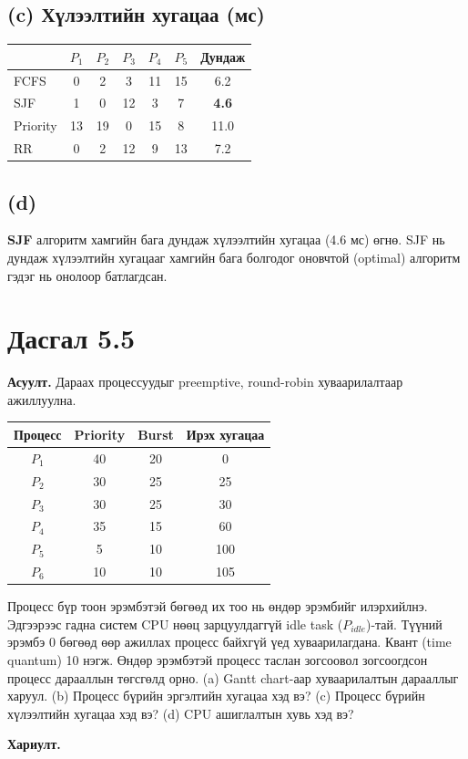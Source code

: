 \documentclass[12pt,a4paper]{article}
\newcommand{\question}[2]{\section{Дасгал #1}\textbf{Асуулт.} #2\par\medskip\textbf{Хариулт.}\par}
\begin{document}
\subsection{(c) Хүлээлтийн хугацаа (мс)}
\begin{center}
\begin{tabular}{lccccc|c}\toprule
 & $P_1$ & $P_2$ & $P_3$ & $P_4$ & $P_5$ & Дундаж\\\midrule
FCFS     & 0  & 2  & 3  & 11 & 15 & 6.2\\
SJF      & 1  & 0  & 12 & 3  & 7  & \textbf{4.6}\\
Priority & 13 & 19 & 0  & 15 & 8  & 11.0\\
RR       & 0  & 2  & 12 & 9  & 13 & 7.2\\\bottomrule
\end{tabular}
\end{center}

\subsection{(d)}
\textbf{SJF} алгоритм хамгийн бага дундаж хүлээлтийн хугацаа (4.6 мс) өгнө. SJF нь дундаж хүлээлтийн хугацааг хамгийн бага болгодог оновчтой (optimal) алгоритм гэдэг нь онолоор батлагдсан.

\question{5.5}{Дараах процессуудыг preemptive, round-robin хуваарилалтаар ажиллуулна.

\begin{center}
\begin{tabular}{cccc}\toprule
Процесс & Priority & Burst & Ирэх хугацаа\\\midrule
$P_1$ & 40 & 20 & 0\\ $P_2$ & 30 & 25 & 25\\ $P_3$ & 30 & 25 & 30\\
$P_4$ & 35 & 15 & 60\\ $P_5$ & 5 & 10 & 100\\ $P_6$ & 10 & 10 & 105\\\bottomrule
\end{tabular}
\end{center}
Процесс бүр тоон эрэмбэтэй бөгөөд их тоо нь өндөр эрэмбийг илэрхийлнэ. Эдгээрээс гадна систем CPU нөөц зарцуулдаггүй idle task ($P_{idle}$)-тай. Түүний эрэмбэ 0 бөгөөд өөр ажиллах процесс байхгүй үед хуваарилагдана. Квант (time quantum) 10 нэгж. Өндөр эрэмбэтэй процесс таслан зогсоовол зогсоогдсон процесс дарааллын төгсгөлд орно. (a) Gantt chart-аар хуваарилалтын дарааллыг харуул. (b) Процесс бүрийн эргэлтийн хугацаа хэд вэ? (c) Процесс бүрийн хүлээлтийн хугацаа хэд вэ? (d) CPU ашиглалтын хувь хэд вэ?}
\end{document}
